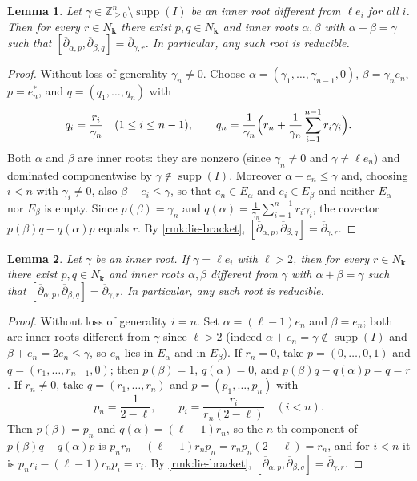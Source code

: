 \documentclass[11pt,letterpaper,reqno]{amsart}
\newtheorem{lemma}[lemma]{Lemma}
\theoremstyle{remark}
\theoremstyle{definition}
\newcommand{\KK}[0]{\ensuremath{\mathbf{k}}}
\newcommand{\ZZ}[0]{\ensuremath{\mathbb{Z}}}
\newcommand{\supp}[0]{\ensuremath{\operatorname{supp}}}
\begin{document}
\begin{lemma}\label{lem:recovery-mixed}
Let $\gamma \in \ZZ^n_{\geq 0}\setminus\supp(I)$ be an inner root different
from $\ell e_i$ for all $i$. Then for every $r\in N_\KK$ there exist
$p, q \in N_\KK$ and inner roots $\alpha, \beta$ with $\alpha+\beta=\gamma$
such that
$[\overline\partial_{\alpha,p},\overline\partial_{\beta,q}]
=\overline\partial_{\gamma,r}$. In particular, any such root is reducible.
\end{lemma}

\begin{proof}
Without loss of generality $\gamma_n\neq 0$. Choose $\alpha=(\gamma_1,\dots,\gamma_{n-1},0)$,
$\beta=\gamma_n e_n$, $p=e_n^*$, and $q=(q_1,\dots,q_n)$ with
$$
q_i=\frac{r_i}{\gamma_n}\quad(1\le i\le n-1),\qquad
q_n=\frac{1}{\gamma_n}\Bigl(r_n+\frac{1}{\gamma_n}
\sum_{i=1}^{n-1}r_i\gamma_i\Bigr).
$$
Both $\alpha$ and $\beta$ are inner roots: they are nonzero (since
$\gamma_n\neq 0$ and $\gamma\neq\ell e_n$) and dominated componentwise by
$\gamma\notin\supp(I)$. Moreover $\alpha+e_n\leq\gamma$ and, choosing $i<n$
with $\gamma_i\neq0$, also $\beta+e_i\leq\gamma$, so that
$e_n\in E_\alpha$ and $e_i\in E_\beta$ and neither $E_\alpha$ nor $E_\beta$
is empty. Since $p(\beta)=\gamma_n$ and
$q(\alpha)=\frac{1}{\gamma_n}\sum_{i=1}^{n-1}r_i\gamma_i$, the covector
$p(\beta)q-q(\alpha)p$ equals $r$. By \cref{rmk:lie-bracket},
$[\overline\partial_{\alpha,p},\overline\partial_{\beta,q}]
=\overline\partial_{\gamma,r}$.
\end{proof}

\begin{lemma}\label{lem:recovery-multiple}
Let $\gamma$ be an inner root. If $\gamma = \ell e_i$ with $\ell > 2$, then for every
$r \in N_\KK$ there exist $p, q \in N_\KK$ and inner roots
$\alpha, \beta$ different from $\gamma$ with $\alpha + \beta = \gamma$
such that
$[\overline\partial_{\alpha,p}, \overline\partial_{\beta,q}]
= \overline\partial_{\gamma,r}$. In particular, any such root is reducible.
\end{lemma}

\begin{proof}
Without loss of generality $i = n$. Set $\alpha = (\ell-1)e_n$ and
$\beta = e_n$; both are inner roots different from $\gamma$ since
$\ell > 2$ (indeed $\alpha+e_n=\gamma\notin\supp(I)$ and
$\beta+e_n=2e_n\leq\gamma$, so $e_n$ lies in $E_\alpha$ and in $E_\beta$). If $r_n = 0$, take $p = (0,\dots,0,1)$ and
$q = (r_1,\dots,r_{n-1},0)$; then $p(\beta) = 1$, $q(\alpha) = 0$,
and $p(\beta)q - q(\alpha)p = q = r$.
If $r_n \neq 0$, take $q = (r_1,\dots,r_n)$ and
$p = (p_1,\dots,p_n)$ with
$$
p_n = \frac{1}{2-\ell}, \qquad
p_i = \frac{r_i}{r_n(2-\ell)} \quad (i < n).
$$
Then $p(\beta) = p_n$ and $q(\alpha) = (\ell-1)r_n$, so the $n$-th
component of $p(\beta)q - q(\alpha)p$ is
$p_n r_n - (\ell-1)r_n p_n = r_n p_n(2-\ell) = r_n$, and for $i < n$
it is $p_n r_i - (\ell-1)r_n p_i = r_i$. By \cref{rmk:lie-bracket},
$[\overline\partial_{\alpha,p}, \overline\partial_{\beta,q}]
= \overline\partial_{\gamma,r}$.
\end{proof}
\end{document}
